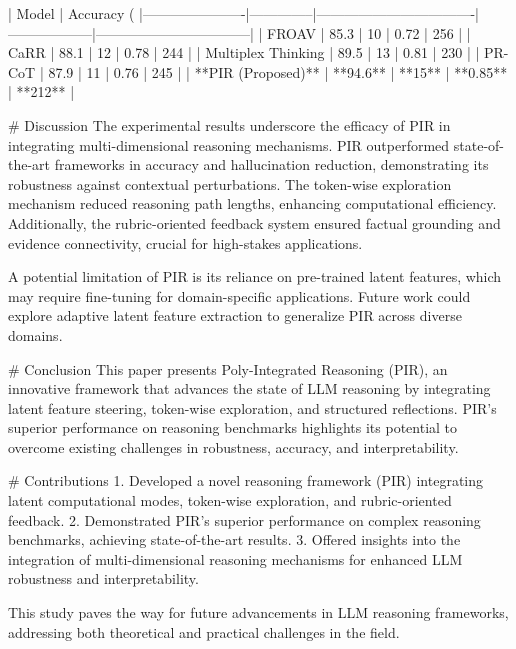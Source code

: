 | Model                | Accuracy (%
|----------------------|--------------|----------------------------------|------------------|---------------------------------|
| FROAV               | 85.3         | 10                               | 0.72             | 256                             |
| CaRR                | 88.1         | 12                               | 0.78             | 244                             |
| Multiplex Thinking  | 89.5         | 13                               | 0.81             | 230                             |
| PR-CoT              | 87.9         | 11                               | 0.76             | 245                             |
| **PIR (Proposed)**  | **94.6**     | **15**                           | **0.85**         | **212**                         |

# Discussion  
The experimental results underscore the efficacy of PIR in integrating multi-dimensional reasoning mechanisms. PIR outperformed state-of-the-art frameworks in accuracy and hallucination reduction, demonstrating its robustness against contextual perturbations. The token-wise exploration mechanism reduced reasoning path lengths, enhancing computational efficiency. Additionally, the rubric-oriented feedback system ensured factual grounding and evidence connectivity, crucial for high-stakes applications.

A potential limitation of PIR is its reliance on pre-trained latent features, which may require fine-tuning for domain-specific applications. Future work could explore adaptive latent feature extraction to generalize PIR across diverse domains.

# Conclusion  
This paper presents Poly-Integrated Reasoning (PIR), an innovative framework that advances the state of LLM reasoning by integrating latent feature steering, token-wise exploration, and structured reflections. PIR's superior performance on reasoning benchmarks highlights its potential to overcome existing challenges in robustness, accuracy, and interpretability.

# Contributions  
1. Developed a novel reasoning framework (PIR) integrating latent computational modes, token-wise exploration, and rubric-oriented feedback.  
2. Demonstrated PIR's superior performance on complex reasoning benchmarks, achieving state-of-the-art results.  
3. Offered insights into the integration of multi-dimensional reasoning mechanisms for enhanced LLM robustness and interpretability.  

This study paves the way for future advancements in LLM reasoning frameworks, addressing both theoretical and practical challenges in the field.